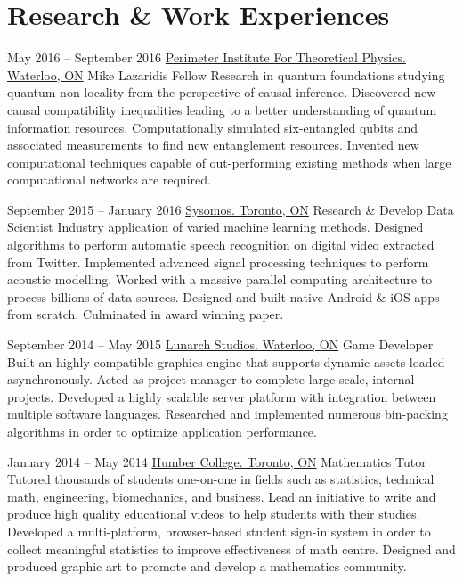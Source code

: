 \documentclass{article}
\begin{document}
    \section{Research \& Work Experiences}
    \begin{experiencelist}
        \item{
            May 2016 -- September 2016
        }{
            \href{www.perimeterinstitute.ca}{Perimeter Institute For Theoretical Physics. Waterloo, ON}
        }{
            Mike Lazaridis Fellow
        }{
            Research in quantum foundations studying quantum non-locality from the perspective of causal inference. Discovered new causal compatibility inequalities leading to a better understanding of quantum information resources. Computationally simulated six-entangled qubits and associated measurements to find new entanglement resources. Invented new computational techniques capable of out-performing existing methods when large computational networks are required.
        }

        \item{
            September 2015 -- January 2016
            }{
                \href{www.sysomos.com}{Sysomos. Toronto, ON}
            }{
                Research \& Develop Data Scientist
            }{
                Industry application of varied machine learning methods. Designed algorithms to perform automatic speech recognition on digital video extracted from Twitter. Implemented advanced signal processing techniques to perform acoustic modelling. Worked with a massive parallel computing architecture to process billions of data sources. Designed and built native Android \& iOS apps from scratch. Culminated in award winning paper.
            }

        \item{
            September 2014 -- May 2015
            }{
                \href{www.lunarchstudios.com}{Lunarch Studios. Waterloo, ON}
            }{
                Game Developer
            }{
                Built an highly-compatible graphics engine that supports dynamic assets loaded asynchronously. Acted as project manager to complete large-scale, internal projects. Developed a highly scalable server platform with integration between multiple software languages. Researched and implemented numerous bin-packing algorithms in order to optimize application performance.
            }

        \item{
            January 2014 -- May 2014
            }{
                \href{www.humber.ca}{Humber College. Toronto, ON}
            }{
                Mathematics Tutor
            }{
                Tutored thousands of students one-on-one in fields such as statistics, technical math, engineering, biomechanics, and business. Lead an initiative to write and produce high quality educational videos to help students with their studies. Developed a multi-platform, browser-based student sign-in system in order to collect meaningful statistics to improve effectiveness of math centre. Designed and produced graphic art to promote and develop a mathematics community.
            }


\end{experiencelist}
\end{document}
